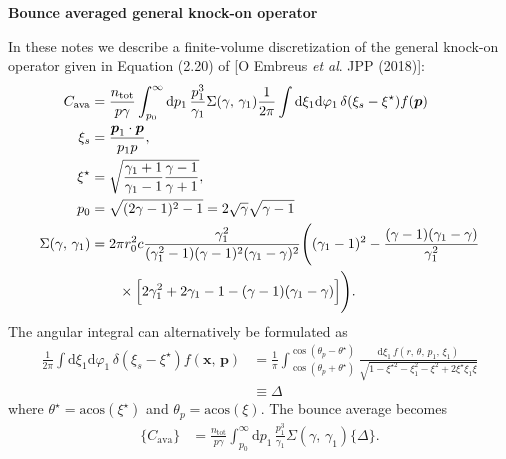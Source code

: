 \documentclass[11pt,a4paper]{article}
\newcommand{\rd}{\ensuremath{\mathrm{d}}}
\newcommand{\sub}[1]{\ensuremath{_{\text{#1}}}}
\begin{document}
\begin{center}
\Large \bf Bounce averaged general knock-on operator
\end{center}

In these notes we describe a finite-volume discretization of the general knock-on operator given in Equation (2.20) of [O Embreus \emph{et al}. JPP (2018)]:
\begin{align}
C\sub{ava} &= \frac{n\sub{tot} }{p\gamma}\int_{p_0}^\infty \rd p_1 \, \frac{p_1^3}{\gamma_1}\Sigma(\gamma,\,\gamma_1)\frac{1}{2\pi}\int \rd \xi_1 \rd \varphi_1 \,\delta(\xi_s-\xi^\star)f(\boldsymbol{p})  \\
\xi_s &= \frac{\boldsymbol{p}_1\cdot\boldsymbol{p}}{p_1p}, \\
\xi^\star &= \sqrt{\frac{\gamma_1+1}{\gamma_1-1}\frac{\gamma-1}{\gamma+1}}, \\
p_0 &= \sqrt{(2\gamma-1)^2-1} = 2\sqrt{\gamma}\sqrt{\gamma-1}\\
\Sigma(\gamma,\,\gamma_1) &= 2\pi r_0^2 c\frac{\gamma_1^2}{(\gamma_1^2-1)(\gamma-1)^2(\gamma_1-\gamma)^2}
\Biggr( (\gamma_1-1)^2 - \frac{(\gamma-1)(\gamma_1-\gamma)}{\gamma_1^2} \nonumber \\
&\hspace{7mm} \times 
\Big[2\gamma_1^2+2\gamma_1-1-(\gamma-1)(\gamma_1-\gamma)\Big]\Biggr).
\end{align}
The angular integral can alternatively be formulated as
\begin{align}
\frac{1}{2\pi}\int \rd \xi_1 \rd \varphi_1 \,\delta(\xi_s-\xi^\star)f(\boldsymbol{x},\,\boldsymbol{p})  &= \frac{1}{\pi}\int_{\cos(\theta_p+\theta^\star)}^{\cos(\theta_p-\theta^\star)}\frac{\rd \xi_1 \, f(r,\,\theta,\,p_1,\,\xi_1)}{\sqrt{1-\xi^{\star2} - \xi_1^2 - \xi^2 + 2\xi^\star \xi_1 \xi}} \nonumber \\
&\equiv \Delta
\end{align}
where $\theta^\star = \text{acos}(\xi^\star)$ and $\theta_p = \text{acos}(\xi)$. 
The bounce average becomes
\begin{align}
\{C\sub{ava}\} &=  \frac{n\sub{tot} }{p\gamma}\int_{p_0}^\infty \rd p_1 \, \frac{p_1^3}{\gamma_1}\Sigma(\gamma,\,\gamma_1) \{\Delta\}.
\end{align}
\end{document}
